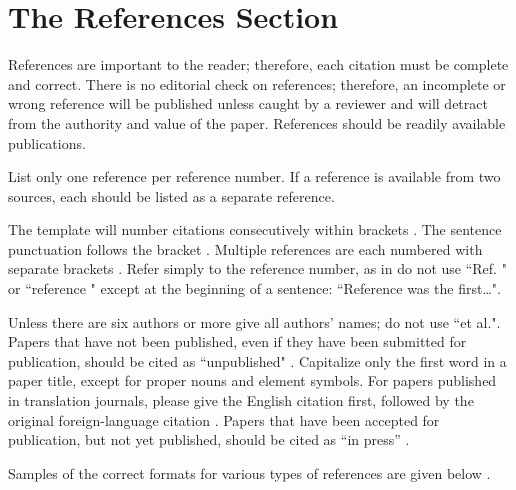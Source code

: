 \documentclass[conference]{IEEEtran}
\begin{document}
\section*{The References Section}
References are important to the reader; therefore, each citation must be complete and correct. There is no editorial check on references; therefore, an incomplete or wrong reference will be published unless caught by a reviewer and will detract from the authority and value of the paper. References should be readily available publications.

List only one reference per reference number. If a reference is available from two sources, each should be listed as a separate reference.

The template will number citations consecutively within brackets \cite{Fuller1988}. The sentence punctuation follows the bracket \cite{Vidmar1992}. Multiple references \cite{Clarke1950,Young1964} are each numbered with separate brackets \cite{Young1964,Jones1991,Reber1968}. Refer simply to the reference number, as in \cite{Talleen1996}\textemdash do not use ``Ref. \cite{Talleen1996}" or ``reference \cite{Talleen1996}" except at the beginning of a sentence: ``Reference \cite{Talleen1996} was the first\ldots".

Unless there are six authors or more give all authors' names; do not use ``et al.". Papers that have not been published, even if they have been submitted for publication, should be cited as ``unpublished" \cite{Ebehard1984,ProcessCorp,Lester2008}. Capitalize only the first word in a paper title, except for proper nouns and element symbols. For papers published in translation journals, please give the English citation first, followed by the original foreign-language citation \cite{Yorozu}. Papers that have been accepted for publication, but not yet published, should be cited as ``in press'' \cite{Miller}.

Samples of the correct formats for various types of references are given below \cite{Fuller1988,Vidmar1992,Clarke1950,Young1964,Jones1991,Reber1968,Talleen1996,Ebehard1984,ProcessCorp,Lester2008,Yorozu,Miller,Alqueres1991,Hwang1997,IEEE1036-2010,Brandli1978}.
\end{document}
